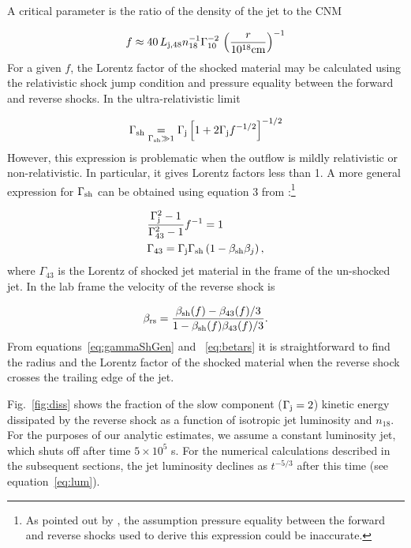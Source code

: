 \documentclass[usenatbib,fleqn]{mnras}
\begin{document}
A critical parameter is the ratio of the density of the jet to the
CNM

\begin{equation}
  f\approx 40\,  L_{\rm j,48} n_{18}^{-1} \Gamma_{10}^{-2} \, \left(\frac{r}{10^{18} {\rm
        cm}}\right)^{-1} 
\end{equation}
%
For a given $f$, the Lorentz factor of the shocked material may be
calculated using the relativistic shock jump condition and pressure
equality between the forward and reverse shocks. In the
ultra-relativistic limit 

\begin{equation}
\Gamma_{\rm sh} \underset{\Gamma_{\rm sh} \gg 1}= \Gamma_{\rm j}\left[1 + 2\Gamma_{\rm j}f^{-1/2}\right]^{-1/2}
\end{equation}
%
However, this expression is problematic when the outflow is mildly
relativistic or non-relativistic. In particular, it gives Lorentz
factors less than 1. A more general expression for $\Gamma_{\rm sh}$
can be obtained using equation 3 from
\citet{Beloborodov&Uhm2006}:\footnote{As pointed out by
  \citet{Beloborodov&Uhm2006}, the assumption pressure equality
  between the forward and reverse shocks used to derive this
  expression could be inaccurate.}

\begin{align}
&\frac{\Gamma_{\rm j}^2-1}{\Gamma_{43}^2-1} f^{-1}=1\\
&\Gamma_{43}=\Gamma_{\rm j} \Gamma_{\rm sh} \left(1-\beta_{\rm sh} \beta_j\right),
\label{eq:gammaShGen}
\end{align}
%
where $\Gamma_{43}$ is the Lorentz of shocked jet material in the
frame of the un-shocked jet. In the lab frame the velocity of the
reverse shock is

\begin{equation}
\beta_{\rm rs}=\frac{\beta_{\rm sh}(f)-\beta_{43}(f)/3}{1-\beta_{\rm
    sh}(f) \beta_{43}(f)/3}.
\label{eq:betars}
\end{equation} 
%
From equations~\eqref{eq:gammaShGen} and ~\eqref{eq:betars} it is
straightforward to find the radius and the Lorentz factor of the
shocked material when the reverse shock crosses the trailing edge of
the jet.

Fig.~\ref{fig:diss} shows the fraction of the slow component
($\Gamma_{\rm j}=2$) kinetic energy dissipated by the reverse shock as a
function of isotropic jet luminosity and $n_{18}$. For the purposes of
our analytic estimates, we assume a constant luminosity jet, which
shuts off after time $5 \times 10^{5}$ s. For the numerical
calculations described in the subsequent sections, the jet luminosity
declines as $t^{-5/3}$ after this time (see equation~\ref{eq:lum}).
\end{document}
